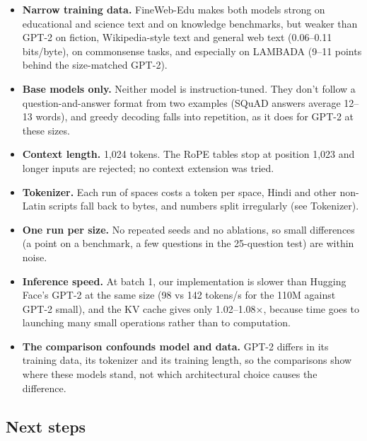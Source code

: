 \documentclass[11pt]{article}
\begin{document}
\begin{itemize}
\item \textbf{Narrow training data.} FineWeb-Edu makes both models strong on educational and science text and on knowledge benchmarks, but weaker than GPT-2 on fiction, Wikipedia-style text and general web text (0.06–0.11 bits/\allowbreak{}byte), on commonsense tasks, and especially on LAMBADA (9–11 points behind the size-matched GPT-2).
\item \textbf{Base models only.} Neither model is instruction-tuned. They don't follow a question-and-answer format from two examples (SQuAD answers average 12–13 words), and greedy decoding falls into repetition, as it does for GPT-2 at these sizes.
\item \textbf{Context length.} 1,024 tokens. The RoPE tables stop at position 1,023 and longer inputs are rejected; no context extension was tried.
\item \textbf{Tokenizer.} Each run of spaces costs a token per space, Hindi and other non-Latin scripts fall back to bytes, and numbers split irregularly (see Tokenizer).
\item \textbf{One run per size.} No repeated seeds and no ablations, so small differences (a point on a benchmark, a few questions in the 25-question test) are within noise.
\item \textbf{Inference speed.} At batch 1, our implementation is slower than Hugging Face's GPT-2 at the same size (98 vs 142 tokens/\allowbreak{}s for the 110M against GPT-2 small), and the KV cache gives only 1.02–1.08×, because time goes to launching many small operations rather than to computation.
\item \textbf{The comparison confounds model and data.} GPT-2 differs in its training data, its tokenizer and its training length, so the comparisons show where these models stand, not which architectural choice causes the difference.
\end{itemize}

\subsection{Next steps}
\end{document}
